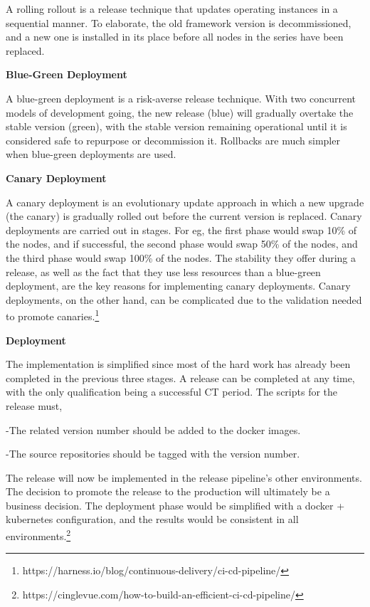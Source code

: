 \hspace{10mm} A rolling rollout is a release technique that updates operating instances in a sequential manner. To elaborate, the old framework version is decommissioned, and a new one is installed in its place before all nodes in the series have been replaced.


\hspace{10mm} \textbf{Blue-Green Deployment}


\hspace{10mm} A blue-green deployment is a risk-averse release technique. With two concurrent models of development going, the new release (blue) will gradually overtake the stable version (green), with the stable version remaining operational until it is considered safe to repurpose or decommission it. Rollbacks are much simpler when blue-green deployments are used.


\hspace{10mm} \textbf{Canary Deployment}


\hspace{10mm} A canary deployment is an evolutionary update approach in which a new upgrade (the canary) is gradually rolled out before the current version is replaced. Canary deployments are carried out in stages. For eg, the first phase would swap 10\% of the nodes, and if successful, the second phase would swap 50\% of the nodes, and the third phase would swap 100\% of the nodes. The stability they offer during a release, as well as the fact that they use less resources than a blue-green deployment, are the key reasons for implementing canary deployments. Canary deployments, on the other hand, can be complicated due to the validation needed to promote canaries.\footnote{https://harness.io/blog/continuous-delivery/ci-cd-pipeline/}


\textbf{Deployment}

The implementation is simplified since most of the hard work has already been completed in the previous three stages. A release can be completed at any time, with the only qualification being a successful CT period. The scripts for the release must,

\hspace{10mm} -The related version number should be added to the docker images.


\hspace{10mm} -The source repositories should be tagged with the version number.

The release will now be implemented in the release pipeline's other environments. The decision to promote the release to the production will ultimately be a business decision. The deployment phase would be simplified with a docker + kubernetes configuration, and the results would be consistent in all environments.\footnote{https://cinglevue.com/how-to-build-an-efficient-ci-cd-pipeline/}


